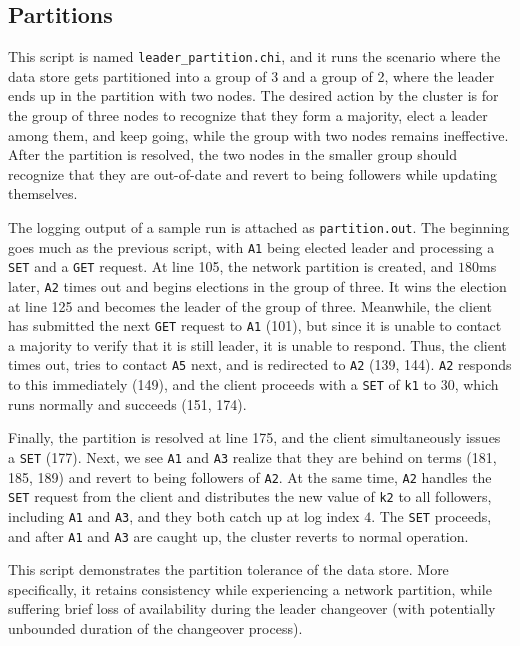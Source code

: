 \documentclass[psamsfonts]{amsart}
\begin{document}
\subsection{Partitions}
This script is named \verb|leader_partition.chi|, and it runs the scenario where the data store gets partitioned into a group of 3 and a group of 2, where the leader ends up in the partition with two nodes. The desired action by the cluster is for the group of three nodes to recognize that they form a majority, elect a leader among them, and keep going, while the group with two nodes remains ineffective. After the partition is resolved, the two nodes in the smaller group should recognize that they are out-of-date and revert to being followers while updating themselves.

The logging output of a sample run is attached as \verb|partition.out|. The beginning goes much as the previous script, with \verb|A1| being elected leader and processing a \verb|SET| and a \verb|GET| request. At line 105, the network partition is created, and $180$ms later, \verb|A2| times out and begins elections in the group of three. It wins the election at line 125 and becomes the leader of the group of three. Meanwhile, the client has submitted the next \verb|GET| request to \verb|A1| (101), but since it is unable to contact a majority to verify that it is still leader, it is unable to respond. Thus, the client times out, tries to contact \verb|A5| next, and is redirected to \verb|A2| (139, 144). \verb|A2| responds to this immediately (149), and the client proceeds with a \verb|SET| of \verb|k1| to $30$, which runs normally and succeeds (151, 174). 

Finally, the partition is resolved at line 175, and the client simultaneously issues a \verb|SET| (177). Next, we see \verb|A1| and \verb|A3| realize that they are behind on terms (181, 185, 189) and revert to being followers of \verb|A2|. At the same time, \verb|A2| handles the \verb|SET| request from the client and distributes the new value of \verb|k2| to all followers, including \verb|A1| and \verb|A3|, and they both catch up at log index $4$. The \verb|SET| proceeds, and after \verb|A1| and \verb|A3| are caught up, the cluster reverts to normal operation.

This script demonstrates the partition tolerance of the data store. More specifically, it retains consistency while experiencing a network partition, while suffering brief loss of availability during the leader changeover (with potentially unbounded duration of the changeover process).
\end{document}
